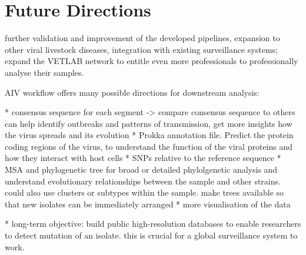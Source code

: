 \section{Future Directions}
\todoit
further validation and improvement of the developed pipelines, expansion to other viral livestock diseases, integration with existing surveillance systems; expand the \ac{VETLAB} network to entitle even more professionals to professionally analyse their samples.

\ac{AIV} workflow offers many possible directions for downstream analysis:

* consensus sequence for each segment -> compare consensus sequence to others can help identify outbreaks and patterns of transmission, get more insights how the virus spreads and its evolution
* Prokka annotation file. Predict the protein coding regions of the virus, to understand the function of the viral proteins and how they interact with host cells
* SNPs relative to the reference sequence
* \ac{MSA} and phylogenetic tree for broad or detailed phylolgenetic analysis and understand evolutionary relationships between the sample and other strains. could also use clusters or subtypes within the sample. make trees available so that new isolates can be immediately arranged
* more visualisation of the data

* long-term objective: build public high-resolution databases to enable researchers to detect mutation of an isolate. this is crucial for a global surveillance system to work.
